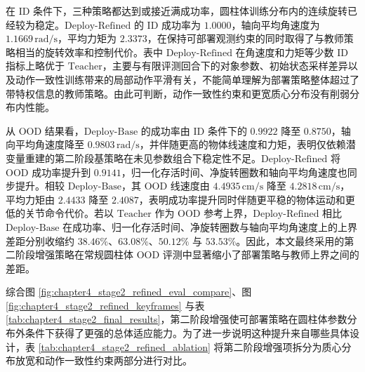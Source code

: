在 ID 条件下，三种策略都达到或接近满成功率，圆柱体训练分布内的连续旋转已经较为稳定。\(\mathrm{Deploy\text{-}Refined}\) 的 ID 成功率为 \(1.0000\)，轴向平均角速度为 \(1.1669\,\mathrm{rad/s}\)，平均力矩为 \(2.3373\)，在保持可部署观测约束的同时取得了与教师策略相当的旋转效率和控制代价。表中 \(\mathrm{Deploy\text{-}Refined}\) 在角速度和力矩等少数 ID 指标上略优于 \(\mathrm{Teacher}\)，主要与有限评测回合下的对象参数、初始状态采样差异以及动作一致性训练带来的局部动作平滑有关，不能简单理解为部署策略整体超过了带特权信息的教师策略。由此可判断，动作一致性约束和更宽质心分布没有削弱分布内性能。

从 OOD 结果看，\(\mathrm{Deploy\text{-}Base}\) 的成功率由 ID 条件下的 \(0.9922\) 降至 \(0.8750\)，轴向平均角速度降至 \(0.9803\,\mathrm{rad/s}\)，并伴随更高的物体线速度和力矩，表明仅依赖潜变量重建的第二阶段基策略在未见参数组合下稳定性不足。\(\mathrm{Deploy\text{-}Refined}\) 将 OOD 成功率提升到 \(0.9141\)，归一化存活时间、净旋转圈数和轴向平均角速度也同步提升。相较 \(\mathrm{Deploy\text{-}Base}\)，其 OOD 线速度由 \(4.4935\,\mathrm{cm/s}\) 降至 \(4.2818\,\mathrm{cm/s}\)，平均力矩由 \(2.4433\) 降至 \(2.4087\)，表明成功率提升同时伴随更平稳的物体运动和更低的关节命令代价。若以 \(\mathrm{Teacher}\) 作为 OOD 参考上界，\(\mathrm{Deploy\text{-}Refined}\) 相比 \(\mathrm{Deploy\text{-}Base}\) 在成功率、归一化存活时间、净旋转圈数与轴向平均角速度上的上界差距分别收缩约 \(38.46\%\)、\(63.08\%\)、\(50.12\%\) 与 \(53.53\%\)。因此，本文最终采用的第二阶段增强策略在常规圆柱体 OOD 评测中显著缩小了部署策略与教师上界之间的差距。

综合图 \ref{fig:chapter4_stage2_refined_eval_compare}、图 \ref{fig:chapter4_stage2_refined_keyframes} 与表 \ref{tab:chapter4_stage2_final_results}，第二阶段增强使可部署策略在圆柱体参数分布外条件下获得了更强的总体适应能力。为了进一步说明这种提升来自哪些具体设计，表 \ref{tab:chapter4_stage2_refined_ablation} 将第二阶段增强项拆分为质心分布放宽和动作一致性约束两部分进行对比。

\begin{table}[htbp]
    \centering
    \caption{第二阶段增强设计的 OOD 消融结果}
    \label{tab:chapter4_stage2_refined_ablation}
    \setlength{\tabcolsep}{3pt}
    \renewcommand{\arraystretch}{1.08}
\end{table}

